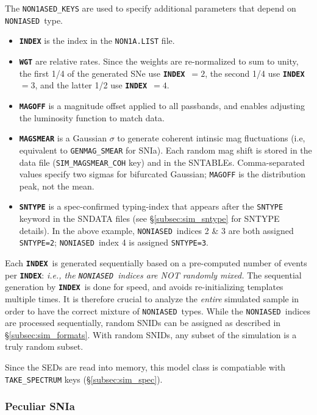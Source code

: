 \documentclass[12pt]{article}
\newcommand{\NONIA}{{\tt NONIASED}}
\newcommand{\indx}{{\bf\tt INDEX}}
\begin{document}
\clearpage
\medskip
The {\tt NON1ASED\_KEYS} are used to specify additional parameters 
that depend on \NONIA\ type. 
\begin{itemize}[noitemsep]
 \item {\tt\bf INDEX} is the index in the {\tt NON1A.LIST} file.
%
 \item {\tt\bf WGT} are relative rates.
   Since the weights are re-normalized to sum to unity,
   the first 1/4 of the generated SNe use \indx\ $=2$,
   the second 1/4 use \indx\ $=3$,
   and the latter 1/2 use \indx\ $=4$.
%
  \item {\tt\bf MAGOFF} is a magnitude offset applied to all passbands, 
      and enables adjusting the luminosity function to match data.    
%
   \item {\tt\bf MAGSMEAR} is a Gaussian $\sigma$ to generate coherent 
       intinsic mag fluctuations 
       (i.e, equivalent to {\tt GENMAG\_SMEAR} for SNIa).
       Each random mag shift is stored in the data file
       ({\tt SIM\_MAGSMEAR\_COH} key) and in the SNTABLEs.
       Comma-separated values specify two sigmas for bifurcated Gaussian;
       {\tt MAGOFF} is the distribution peak, not the mean.
%
  \item {\tt\bf SNTYPE} is a spec-confirmed typing-index that appears
       after the {\tt SNTYPE} keyword in the 
       SNDATA files (see \S\ref{subsec:sim_sntype} for SNTYPE details).
       In the above example, \NONIA\ indices 2 \& 3 are both 
       assigned {\tt SNTYPE=2};
       \NONIA\ index 4 is assigned  {\tt SNTYPE=3}.  
\end{itemize}


Each \indx\ is generated sequentially based on a pre-computed number
of events per \indx:
{\it i.e., the \NONIA\ indices are NOT randomly mixed.}
The sequential generation by \indx\ is done for speed,
and avoids re-initializing templates multiple times.
It is therefore crucial to analyze the {\it entire}
simulated sample in order to have the correct mixture
of \NONIA\ types.
While the \NONIA\ indices are processed sequentially,
random SNIDs can be assigned as described in   
\S\ref{subsec:sim_formats}. With random SNIDs,
any subset of the simulation is a truly random subset.

Since the SEDs are read into memory, this model class is compatiable
with {\tt TAKE\_SPECTRUM} keys (\S\ref{subsec:sim_spec}).

\subsubsection{Peculiar SNIa}
\label{sss:pec1a}
\end{document}
